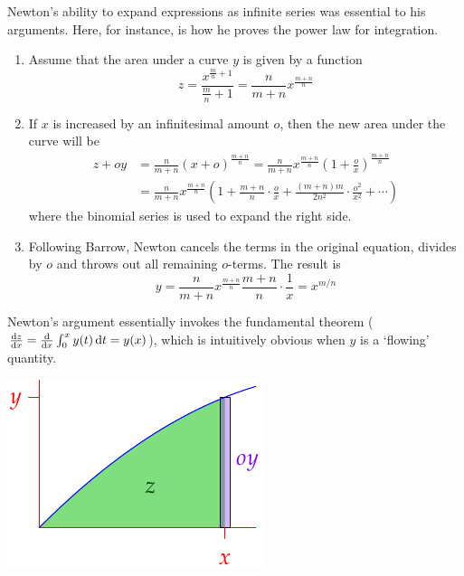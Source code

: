 Newton's ability to expand expressions as infinite series was essential  to his arguments. Here, for instance, is how he proves the power law for integration.
\begin{enumerate}
  \item Assume that the area under a curve $y$ is given by a function
  \[z=\frac{x^{\frac mn+1}}{\frac mn+1}=\frac n{m+n}x^{\frac{m+n}n}\]
  \item If $x$ is increased by an infinitesimal amount $o$, then the new area under the curve will be
  \begin{align*}
  z+oy&=\frac n{m+n}(x+o)^{\frac{m+n}n} =\frac n{m+n}x^{\frac{m+n}n}\left(1+\frac ox\right)^{\frac{m+n}n}\\
  &=\frac n{m+n}x^{\frac{m+n}n}\left(1+\frac{m+n}n\cdot\frac ox+\frac{(m+n)m}{2n^2}\cdot\frac{o^2}{x^2}+\cdots\right)
  \end{align*}
  where the binomial series is used to expand the right side.
  \item Following Barrow, Newton cancels the terms in the original equation, divides by $o$ and throws out all remaining $o$-terms. The result is
  \[y=\frac n{m+n}x^{\frac{m+n}n}\frac{m+n}n\cdot\frac 1x=x^{m/n}\]
\end{enumerate}\vspace{-5pt}

\begin{minipage}[t]{0.68\linewidth}\vspace{0pt}
Newton's argument essentially invokes the fundamental theorem ($\diff[z]{x}=\diff x\int_0^xy(t)\,\dt=y(x)$), which is intuitively obvious when $y$ is a `flowing' quantity.
\end{minipage}\hfill\begin{minipage}[t]{0.29\linewidth}\vspace{-45pt}
\flushright\includegraphics{ftcold}
\end{minipage}\par

